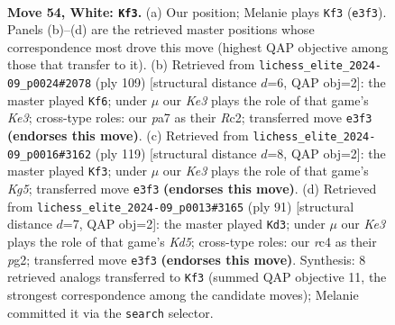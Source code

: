 \documentclass[11pt]{article}
\begin{document}
\clearpage

\begin{figure}[p]\centering
\begin{subfigure}{0.46\textwidth}\centering
\resizebox{\linewidth}{!}{%
\newchessgame
\chessboard[
  setfen={8/p2p2k1/2p5/5P2/2r5/4K3/8/8 w - - 9 54},
  showmover=false,
  pgfstyle=straightmove, color=movearrow, markmove={e3-f3}
]}
\caption{}
\end{subfigure}\hfill
\begin{subfigure}{0.46\textwidth}\centering
\resizebox{\linewidth}{!}{%
\newchessgame
\chessboard[
  setfen={8/8/4k3/7R/5p2/5P1P/2r5/5K2 b - - 2 55},
  showmover=false,
  pgfstyle=straightmove, color=movearrow, markmove={e6-f6}
]}
\caption{}
\end{subfigure}
\\[4pt]
\begin{subfigure}{0.46\textwidth}\centering
\resizebox{\linewidth}{!}{%
\newchessgame
\chessboard[
  setfen={8/5PPR/8/p7/2pK2k1/8/8/8 b - - 0 60},
  showmover=false,
  pgfstyle=straightmove, color=movearrow, markmove={g4-f3}
]}
\caption{}
\end{subfigure}\hfill
\begin{subfigure}{0.46\textwidth}\centering
\resizebox{\linewidth}{!}{%
\newchessgame
\chessboard[
  setfen={8/8/7p/1p6/3k4/1K4P1/5PP1/8 b - - 2 46},
  showmover=false,
  pgfstyle=straightmove, color=movearrow, markmove={d4-d3}
]}
\caption{}
\end{subfigure}
\caption{\textbf{Move 54, White: \texttt{Kf3}.} (a) Our position; Melanie plays \texttt{Kf3} (\texttt{e3f3}). Panels (b)--(d) are the retrieved master positions whose correspondence most drove this move (highest QAP objective among those that transfer to it). (b) Retrieved from \texttt{lichess\_elite\_2024-09\_p0024\#2078} (ply 109) [structural distance $d$=6, QAP obj=2]: the master played \texttt{Kf6}; under $\mu$ our \emph{Ke3} plays the role of that game's \emph{Ke3}; cross-type roles: our \emph{p}a7 as their \emph{R}c2; transferred move \texttt{e3f3} \textbf{(endorses this move)}. (c) Retrieved from \texttt{lichess\_elite\_2024-09\_p0016\#3162} (ply 119) [structural distance $d$=8, QAP obj=2]: the master played \texttt{Kf3}; under $\mu$ our \emph{Ke3} plays the role of that game's \emph{Kg5}; transferred move \texttt{e3f3} \textbf{(endorses this move)}. (d) Retrieved from \texttt{lichess\_elite\_2024-09\_p0013\#3165} (ply 91) [structural distance $d$=7, QAP obj=2]: the master played \texttt{Kd3}; under $\mu$ our \emph{Ke3} plays the role of that game's \emph{Kd5}; cross-type roles: our \emph{r}c4 as their \emph{p}g2; transferred move \texttt{e3f3} \textbf{(endorses this move)}. Synthesis: 8 retrieved analogs transferred to \texttt{Kf3} (summed QAP objective 11, the strongest correspondence among the candidate moves); Melanie committed it via the \texttt{search} selector.}
\label{fig:thought-m106}
\end{figure}
\end{document}
